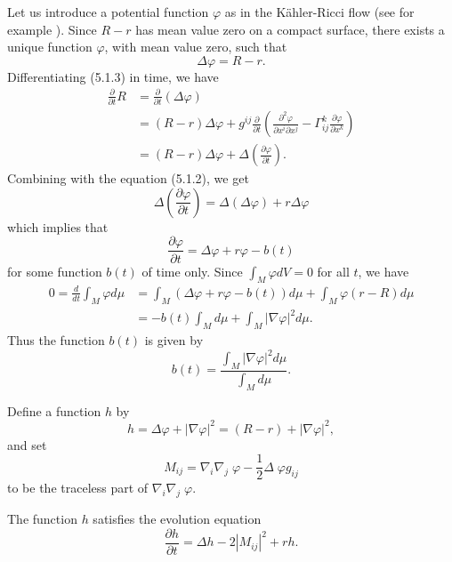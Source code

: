 Let us introduce a potential function $\varphi$ as in the
K\"ahler-Ricci flow (see for example \cite{Cao85}). Since $R-r$
has mean value zero on a compact surface, there exists a unique
function $\varphi$, with mean value zero, such that \begin{equation}
\Delta \varphi=R-r.     %
\end{equation} Differentiating (5.1.3) in time, we have
\begin{align*}
\frac{\partial }{\partial t}R
&  =\frac{\partial }{\partial t}(\Delta\varphi)\\
&  =(R-r)\Delta\varphi+g^{ij}\frac{\partial}{\partial
t}\left(\frac{\partial^2\varphi}{\partial x^i\partial x^j}
-\Gamma^k_{ij}\frac{\partial \varphi}{\partial x^k}\right)\\[4mm]
&  =(R-r)\Delta \varphi +\Delta\left(\frac{\partial \varphi}{\partial
t}\right).
\end{align*}
Combining with the equation (5.1.2), we get
$$
\Delta\left(\frac{\partial \varphi}{\partial t}\right)
=\Delta(\Delta\varphi)+r\Delta\varphi
$$
which implies that \begin{equation} \frac{\partial \varphi}{\partial
t}=\Delta\varphi+r\varphi-b(t)
\end{equation} for some function $b(t)$ of time only. Since $\int_M\varphi
dV=0$ for all $t$, we have
\begin{align*}
0=\frac{d}{dt}\int_M\varphi d\mu&  =\int_M(\Delta
\varphi+r\varphi-b(t))d\mu+\int_M\varphi(r-R)d\mu \\
&  = -b(t)\int_Md\mu+\int_M|\nabla \varphi|^2d\mu.
\end{align*}
Thus the function $b(t)$ is given by
$$
b(t)=\frac{\int_M|\nabla\varphi|^2d\mu}{\int_Md\mu}.
$$

Define a function $h$ by
$$
h=\Delta\varphi+|\nabla\varphi|^2=(R-r)+|\nabla\varphi|^2,
$$
and set
$$
M_{ij}=\nabla_i\nabla_{j}\; \varphi-\frac{1}{2}\Delta\;\varphi
g_{ij}
$$
to be the traceless part of $\nabla_i\nabla_j\; \varphi$.

\begin{lemma} 
  \label{lem:cz-curvature-potential-density-evolution}

The function $h$ satisfies the evolution equation \begin{equation}
\frac{\partial h}{\partial t}=\Delta h-2|M_{ij}|^2+rh.
\end{equation}
\end{lemma}

